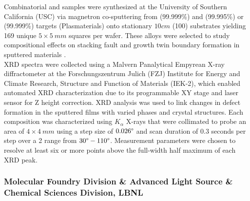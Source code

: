 Combinatorial  and  samples were synthesized at the University of Southern California (USC) via magnetron co-sputtering from  (99.999\%) and  (99.995\%) or  (99.999\%) targets (Plasmaterials) onto stationary $10 \si{cm}$  (100) substrates yielding 169 unique $5 \times 5 \ \si{mm}$ squares per wafer. These alloys were selected to study compositional effects on stacking fault and growth twin boundary formation in sputtered materials \cite{2024AcMat.27019839A,alwen2024combinatorial}. \\

XRD spectra were collected using a Malvern Panalytical Empyrean X-ray diffractometer at the Forschungszentrum Julich (FZJ) Institute for Energy and Climate Research, Structure and Function of Materials (IEK-2), which enabled automated XRD characterization due to its programmable XY stage and laser sensor for Z height correction. XRD analysis was used to link changes in defect formation in the sputtered films with varied phases and crystal structures. Each composition was characterized using  $K_\alpha$ X-rays that were collimated to probe an area of $4 \times 4 \ \si{mm}$ using a step size of $0.026\degree$ and scan duration of $0.3$ seconds per step over a 2 range from $30\degree - 110\degree$. Measurement parameters were chosen to resolve at least six or more points above the full-width half maximum of each XRD peak.

\subsubsection*{Molecular Foundry Division \& Advanced Light Source \& Chemical Sciences Division, LBNL}

